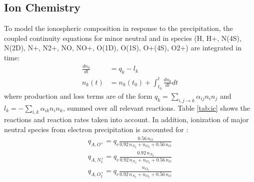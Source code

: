 \documentclass[10pt, a4paper]{article}
\numberwithin{equation}{section}										%
\begin{document}
\subsection{Ion Chemistry}
To model the ionospheric composition in response to the precipitation, the coupled continuity equations for minor neutral and in species (H, H+, N(4S), N(2D), N+, N2+, NO, NO+, O(1D), O(1S), O+(4S), O2+) are integrated in time:
\begin{align}
	\frac{dn_k}{dt} &= q_k - l_k\\
	\label{eq:ode}
	n_k(t) &= n_k(t_0) + \int_{t_0}^t \frac{dn_k}{dt} dt
\end{align}
where production and loss terms are of the form $q_k = \sum_{i, j \rightarrow k} \alpha_{ij} n_i n_j$ and $l_k = -\sum_{i, k} \alpha_{ik} n_i n_k$, summed over all relevant reactions. Table \ref{tab:ic} shows the reactions and reaction rates taken into account. In addition, ionization of major neutral species from electron precipitation is accounted for \cite{rees_physics_1989}:
\begin{align}
	q_{A, O^+}  = q_e \frac {0.56 \, n_O}{0.92\, n_{N_2} + n_{O_2} + 0.56\, n_O}\\
	q_{A, N_2^+} = q_e \frac {0.92\, n_{N_2}}{0.92\, n_{N_2} + n_{O_2} + 0.56 \,n_O}\\
	q_{A, O_2^+} = q_e \frac {n_{O_2}}{0.92\, n_{N_2} + n_{O_2} + 0.56\, n_O}
\end{align}
%
\end{document}
